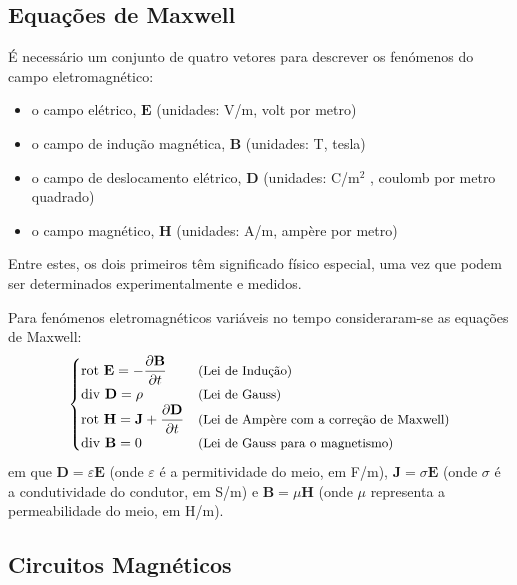 \subsection{Equações de Maxwell}
\label{subsec:maxwell-eq}

É necessário um conjunto de quatro vetores para descrever os fenómenos do campo eletromagnético:
\begin{itemize}
    \item[] o campo elétrico, $\mathbf{E}$ (unidades: V/m, volt por metro)
    \item[] o campo de indução magnética, $\mathbf{B}$ (unidades: T, tesla)
    \item[] o campo de deslocamento elétrico, $\mathbf{D}$ (unidades: C/m$^2$ , coulomb por metro quadrado)
    \item[] o campo magnético, $\mathbf{H}$ (unidades: A/m, ampère por metro)
\end{itemize}
\noindent Entre estes, os dois primeiros têm significado físico especial, uma vez que podem ser determinados experimentalmente e medidos.

Para fenómenos eletromagnéticos variáveis no tempo consideraram-se as equações de Maxwell:
$$
    \begin{cases}%
        \text{rot } \mathbf{E} = -\dfrac{\partial \mathbf{B}}{\partial t} & \text{\small (Lei de Indução)} \\
        \text{div } \mathbf{D} = \rho & \text{\small (Lei de Gauss)} \\
        \text{rot } \mathbf{H} = \mathbf{J} + \dfrac{\partial \mathbf{D}}{\partial t} & \text{\small (Lei de Ampère com a correção de Maxwell)} \\
        \text{div } \mathbf{B} = 0 & \text{\small (Lei de Gauss para o magnetismo)}
    \end{cases}
$$
em que $\mathbf{D} = \varepsilon \mathbf{E}$ (onde $\varepsilon$ é a permitividade do meio, em F/m), $\mathbf{J} = \sigma \mathbf{E}$ (onde $\sigma$ é a condutividade do condutor, em S/m) e $\mathbf{B} = \mu \mathbf{H}$ (onde $\mu$ representa a permeabilidade do meio, em H/m).

\subsection{Circuitos Magnéticos}
\label{subsec:circuitos-magneticos}


